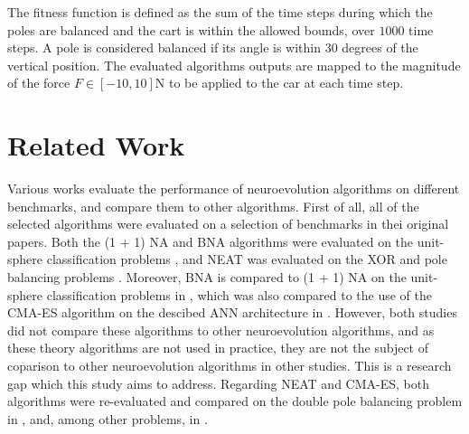 The fitness function is defined as the sum of the time steps during which the poles are balanced and the cart is within the allowed bounds, over $1000$ time steps.
A pole is considered balanced if its angle is within $30$ degrees of the vertical position.
The evaluated algorithms outputs are mapped to the magnitude of the force $F \in [-10, 10]$N to be applied to the car at each time step.

\section{Related Work}

Various works evaluate the performance of neuroevolution algorithms on different benchmarks, and compare them to other algorithms.
First of all, all of the selected algorithms were evaluated on a selection of benchmarks in thei original papers.
Both the (1 + 1) NA and BNA algorithms were evaluated on the unit-sphere classification problems \cite{na, bna}, and NEAT was evaluated on the XOR and pole balancing problems \cite{neat}.
Moreover, BNA is compared to (1 + 1) NA on the unit-sphere classification problems in \cite{bna}, which was also compared to the use of the CMA-ES algorithm on the descibed ANN architecture in
\cite{na}. However, both studies did not compare these algorithms to other neuroevolution algorithms, and as these theory algorithms are not used in practice, they are not the subject of
coparison to other neuroevolution algorithms in other studies. This is a research gap which this study aims to address.
Regarding NEAT and CMA-ES, both algorithms were re-evaluated and compared on the double pole balancing problem in \cite{neuroevolution_es_rl}, and, among other problems, in \cite{robust}.

